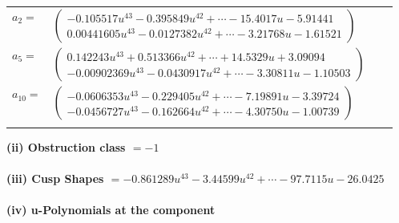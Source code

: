 \documentclass[1p]{elsarticle_modified}
\theoremstyle{definition}
\begin{document}
\begin{tabular}{m{7pt} m{180pt} m{7pt} m{180pt} }
\flushright $a_{2}=$&$\begin{pmatrix}-0.105517 u^{43}-0.395849 u^{42}+\cdots-15.4017 u-5.91441\\0.00441605 u^{43}-0.0127382 u^{42}+\cdots-3.21768 u-1.61521\end{pmatrix}$ \\
\flushright $a_{5}=$&$\begin{pmatrix}0.142243 u^{43}+0.513366 u^{42}+\cdots+14.5329 u+3.09094\\-0.00902369 u^{43}-0.0430917 u^{42}+\cdots-3.30811 u-1.10503\end{pmatrix}$ \\
\flushright $a_{10}=$&$\begin{pmatrix}-0.0606353 u^{43}-0.229405 u^{42}+\cdots-7.19891 u-3.39724\\-0.0456727 u^{43}-0.162664 u^{42}+\cdots-4.30750 u-1.00739\end{pmatrix}$\\&\end{tabular}
\flushleft \textbf{(ii) Obstruction class $= -1$}\\~\\
\flushleft \textbf{(iii) Cusp Shapes $= -0.861289 u^{43}-3.44599 u^{42}+\cdots-97.7115 u-26.0425$}\\~\\
\newpage\renewcommand{\arraystretch}{1}
\flushleft \textbf{(iv) u-Polynomials at the component}\newline \\
\end{document}
